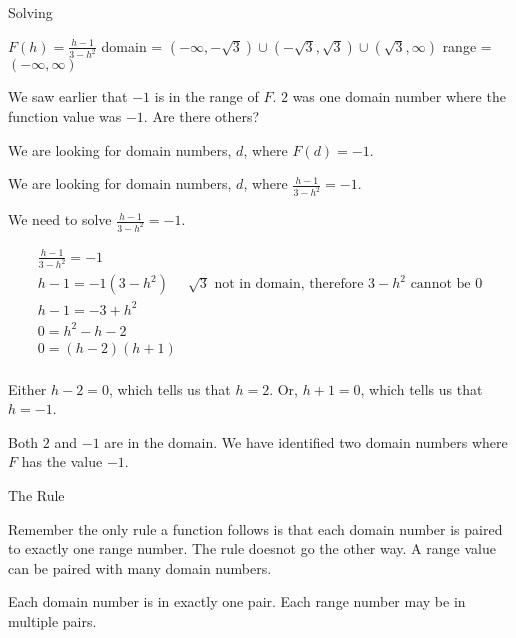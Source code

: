 \documentclass{ximera}
\begin{document}
\begin{example}   Solving

$F(h) = \frac{h-1}{3-h^2}$
domain = $(-\infty, -\sqrt{3}) \cup (-\sqrt{3}, \sqrt{3}) \cup (\sqrt{3}, \infty)$
range = $(-\infty, \infty)$


We saw earlier that $-1$ is in the range of $F$. $2$ was one domain number where the function value was $-1$. Are there others?


We are looking for domain numbers, $d$, where $F(d) = -1$.  

We are looking for domain numbers, $d$, where $\frac{h-1}{3-h^2} = -1$.  

We need to solve $\frac{h-1}{3-h^2} = -1$.



\[
\begin{array}{ll}

\frac{h-1}{3-h^2} = -1 &  \\
h - 1 = -1 (3 - h^2)    &   \sqrt{3} \text{ not in domain, therefore } 3 - h^2 \text{ cannot be } 0  \\
h - 1 = -3 + h^2    &      \\
0 = h^2 - h - 2    &      \\
0 =(h-2)(h+1)    &      \\
\end{array}
\]


Either $h-2 = 0$, which tells us that $h = 2$. Or, $h+1 = 0$, which tells us that $h = -1$.

Both $2$ and $-1$ are in the domain.  We have identified two domain numbers where $F$ has the value $-1$.



\end{example}



\begin{remark}  The Rule

Remember the only rule a function follows is that each domain number is paired to exactly one range number.  The rule doesnot go the other way.  A range value can be paired with many domain numbers.

Each domain number is in exactly one pair.
Each range number may be in multiple pairs.


\end{remark}
\end{document}
